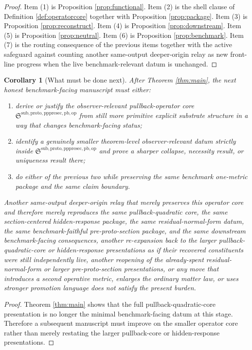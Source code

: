 \documentclass[11pt]{article}
\newcommand{\PullbackOperatorCore}{\mathfrak S^{\mathrm{sub,proto,pppresec,pb,op}}}
\newtheorem{corollary}{Corollary}
\begin{document}
\begin{proof}
Item (1) is Proposition \ref{prop:functional}. Item (2) is the shell clause of Definition \ref{def:operatorcore} together with Proposition \ref{prop:package}. Item (3) is Proposition \ref{prop:reconstruct}. Item (4) is Proposition \ref{prop:downstream}. Item (5) is Proposition \ref{prop:neutral}. Item (6) is Proposition \ref{prop:benchmark}. Item (7) is the routing consequence of the previous items together with the active safeguard against counting another same-output deeper-origin relay as new front-line progress when the live benchmark-relevant datum is unchanged.
\end{proof}

\begin{corollary}[What must be done next]
\label{cor:next}
After Theorem \ref{thm:main}, the next honest benchmark-facing manuscript must either:
\begin{enumerate}
    \item derive or justify the observer-relevant pullback-operator core \(\PullbackOperatorCore\) from still more primitive explicit substrate structure in a way that changes benchmark-facing status;
    \item identify a genuinely smaller theorem-level observer-relevant datum strictly inside \(\PullbackOperatorCore\) and prove a sharper collapse, necessity result, or uniqueness result there;
    \item do either of the previous two while preserving the same benchmark one-metric package and the same claim boundary.
\end{enumerate}
Another same-output deeper-origin relay that merely preserves this operator core and therefore merely reproduces the same pullback-quadratic core, the same section-centered hidden-response package, the same residual-normal-form datum, the same benchmark-faithful pre-proto-section package, and the same downstream benchmark-facing consequences, another re-expansion back to the larger pullback-quadratic-core or hidden-response presentations as if their recovered constituents were still independently live, another reopening of the already-spent residual-normal-form or larger pre-proto-section presentations, or any move that introduces a second operative metric, enlarges the ordinary matter law, or uses stronger promotion language does not satisfy the present burden.
\end{corollary}

\begin{proof}
Theorem \ref{thm:main} shows that the full pullback-quadratic-core presentation is no longer the minimal benchmark-facing datum at this stage. Therefore a subsequent manuscript must improve on the smaller operator core rather than merely restating the larger pullback-core or hidden-response presentations.
\end{proof}
\end{document}
